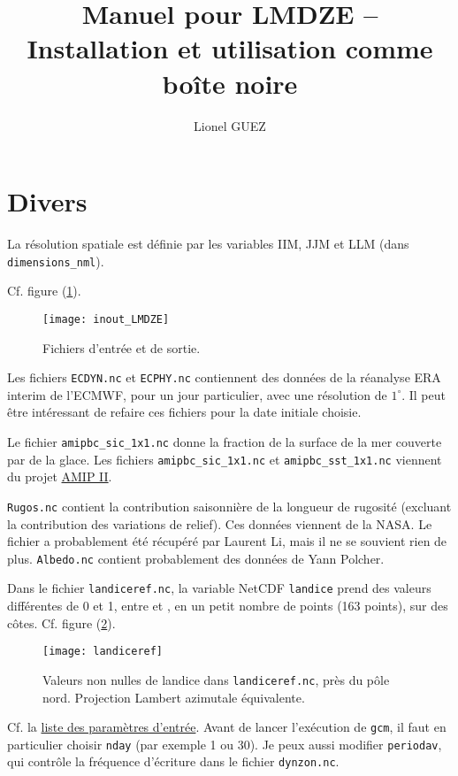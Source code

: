 \documentclass[a4paper,english,french]{article}
\author{Lionel GUEZ}
\title{Manuel pour LMDZE -- Installation et utilisation comme boîte noire}
\begin{document}
\maketitle
\tableofcontents

\section{Divers}

La résolution spatiale est définie par les variables IIM, JJM et LLM
(dans \verb+dimensions_nml+).

Cf. figure (\ref{fig:inout_LMDZE}).
\begin{figure}[htbp]
  \centering
  \texttt{[image: inout\_LMDZE]}
  \caption{Fichiers d'entrée et de sortie.}
  \label{fig:inout_LMDZE}
\end{figure}
Les fichiers \verb+ECDYN.nc+ et \verb+ECPHY.nc+ contiennent des
données de la réanalyse ERA interim de l'ECMWF, pour un jour
particulier, avec une résolution de $1^\circ$. Il peut être
intéressant de refaire ces fichiers pour la date initiale choisie.

Le fichier \verb+amipbc_sic_1x1.nc+ donne la fraction de la surface de
la mer couverte par de la glace. Les fichiers \verb+amipbc_sic_1x1.nc+
et \verb+amipbc_sst_1x1.nc+ viennent du projet
\href{http://www-pcmdi.llnl.gov/projects/amip/AMIP2EXPDSN/BCS/bcsintro.php}{AMIP
  II}.

\verb+Rugos.nc+ contient la contribution saisonnière de la longueur de
rugosité (excluant la contribution des variations de relief). Ces
données viennent de la NASA. Le fichier a probablement été récupéré
par Laurent Li, mais il ne se souvient rien de plus. \verb+Albedo.nc+
contient probablement des données de Yann Polcher.

Dans le fichier \verb+landiceref.nc+, la variable NetCDF
\verb+landice+ prend des valeurs différentes de 0 et 1, entre
 et , en un petit nombre de points (163 points),
sur des côtes. Cf. figure (\ref{fig:landiceref}).
\begin{figure}[htbp]
  \centering
  \texttt{[image: landiceref]}
  \caption{Valeurs non nulles de landice dans \texttt{landiceref.nc},
    près du pôle nord. Projection Lambert azimutale équivalente.}
  \label{fig:landiceref}
\end{figure}

Cf. la \href{file://../namelists.ods}{liste des paramètres d'entrée}.
Avant de lancer l'exécution de \verb+gcm+, il faut en particulier
choisir \verb+nday+ (par exemple 1 ou 30). Je peux aussi modifier
\verb+periodav+, qui contrôle la fréquence d'écriture dans le fichier
\verb+dynzon.nc+.
\end{document}

